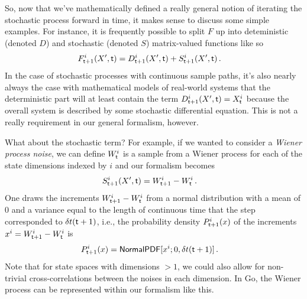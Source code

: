 \documentclass{book}
\begin{document}
So, now that we've mathematically defined a really general notion of iterating the stochastic process forward in time, it makes sense to discuss some simple examples. For instance, it is frequently possible to split $F$ up into deteministic (denoted $D$) and stochastic (denoted $S$) matrix-valued functions like so
\begin{align}
& F^{i}_{{\sf t}+1}(X',{\sf t}) = D^{i}_{{\sf t}+1}(X',{\sf t}) + S^{i}_{{\sf t}+1}(X',{\sf t}) \,.
\end{align}
In the case of stochastic processes with continuous sample paths, it's also nearly always the case with mathematical models of real-world systems that the deterministic part will at least contain the term $D^{i}_{{\sf t}+1}(X',{\sf t}) = X^i_{\sf t}$ because the overall system is described by some stochastic differential equation. This is not a really requirement in our general formalism, however.

What about the stochastic term? For example, if we wanted to consider a \emph{Wiener process noise}, we can define $W^i_{{\sf t}}$ is a sample from a Wiener process for each of the state dimensions indexed by $i$ and our formalism becomes
\begin{align}
& S^{i}_{{\sf t}+1}(X',{\sf t}) = W^i_{{\sf t}+1}-W^i_{\sf t} \label{eq:wiener}\,.
\end{align}
One draws the increments $W^i_{{\sf t}+1}-W^i_{\sf t}$ from a normal distribution with a mean of $0$ and a variance equal to the length of continuous time that the step corresponded to $\delta t({\sf t}+1)$, i.e., the probability density $P^i_{{\sf t}+1}(x)$ of the increments $x^i=W^i_{{\sf t}+1}-W^i_{\sf t}$ is
\begin{align}
P^i_{{\sf t}+1}(x) &= {\sf NormalPDF}[x^i;0,\delta t({\sf t}+1)] \,.
\end{align}
Note that for state spaces with dimensions $>1$, we could also allow for non-trivial cross-correlations between the noises in each dimension. In Go, the Wiener process can be represented within our formalism like this.
\end{document}
